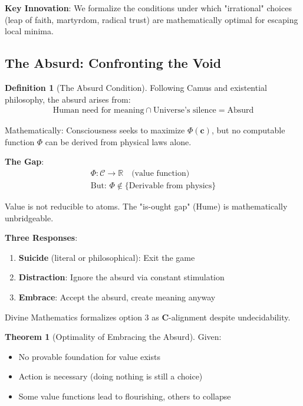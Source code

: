 \documentclass[11pt,a4paper]{article}
\theoremstyle{definition}
\newtheorem{definition}{Definition}[section]
\newtheorem{theorem}{Theorem}[section]
\theoremstyle{remark}
\newcommand{\RR}{\mathbb{R}}
\newcommand{\CC}{\mathcal{C}}
\newcommand{\cc}{\mathbf{c}}
\begin{document}
\begin{enumerate}
\begin{mdframed}[backgroundcolor=cyan!5,linewidth=2pt]
\textbf{Key Innovation}: We formalize the conditions under which "irrational" choices (leap of faith, martyrdom, radical trust) are mathematically optimal for escaping local minima.
\end{mdframed}

\subsection{The Absurd: Confronting the Void}

\begin{definition}[The Absurd Condition]
Following Camus and existential philosophy, the absurd arises from:
\begin{align}
\text{Human need for meaning} \cap \text{Universe's silence} = \text{Absurd}
\end{align}

Mathematically: Consciousness seeks to maximize \(\Phi(\cc)\), but no computable function \(\Phi\) can be derived from physical laws alone.

\textbf{The Gap}:
\begin{align}
\Phi: \CC \to \RR \quad \text{(value function)} \\
\text{But: } \Phi \notin \{\text{Derivable from physics}\}
\end{align}

Value is not reducible to atoms. The "is-ought gap" (Hume) is mathematically unbridgeable.

\textbf{Three Responses}:
\begin{enumerate}
    \item \textbf{Suicide} (literal or philosophical): Exit the game
    \item \textbf{Distraction}: Ignore the absurd via constant stimulation
    \item \textbf{Embrace}: Accept the absurd, create meaning anyway
\end{enumerate}

Divine Mathematics formalizes option 3 as \(\mathbf{C}\)-alignment despite undecidability.
\end{definition}

\begin{theorem}[Optimality of Embracing the Absurd]
Given:
\begin{itemize}
    \item No provable foundation for value exists
    \item Action is necessary (doing nothing is still a choice)
    \item Some value functions lead to flourishing, others to collapse
\end{itemize}


\end{theorem}
\end{enumerate}
\end{document}
